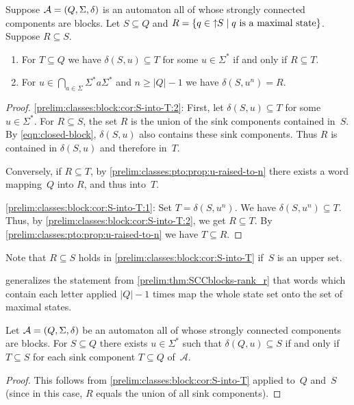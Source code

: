 \begin{corollary}  \label{prelim:classes:block:cor:S-into-T}
	\label{prelim:classes:block:cor:equalR}
	Suppose $\mathcal A = (Q, \Sigma, \delta)$ is an automaton all of whose strongly connected components are blocks.
	Let $S \subseteq Q$ and $R = \{ q \in \mbox{\ensuremath{\displaystyle \uparrow \!\!S}} \mid \text{$q$ is a maximal state} \}$.
	Suppose $R \subseteq S$.
	
	\begin{enumerate}
	\item \label{prelim:classes:block:cor:S-into-T:2} For $T \subseteq Q$ we have $\delta(S, u) \subseteq T$ for some $u \in \Sigma^*$ if and only if $R \subseteq T$.
		
	\item \label{prelim:classes:block:cor:S-into-T:1} For $u \in \bigcap_{a \in \Sigma} \Sigma^* a \Sigma^*$
	and $n \ge |Q| - 1$	we have
	$
	\delta(S, u^{n}) = R.
	$
	\end{enumerate}	
\end{corollary}
\begin{proof}
 \ref{prelim:classes:block:cor:S-into-T:2}: First, let $\delta(S, u) \subseteq T$
 for some $u \in \Sigma^*$.
 For $R \subseteq S$, the set $R$ is the union of the sink components contained in~$S$.
 By \cref{eqn:closed-block}, $\delta(S, u)$
 also contains these sink components.
 Thus $R$ is contained in $\delta(S, u)$ and therefore in~$T$.
 
 Conversely, if $R \subseteq T$, 
 by \cref{prelim:classes:pto:prop:u-raised-to-n} 
 there exists a word mapping~$Q$ into $R$,
 and thus into~$T$.
 
 \ref{prelim:classes:block:cor:S-into-T:1}: Set $T = \delta(S, u^n)$.
 We have $\delta(S, u^n) \subseteq T$.
 Thus, by \cref{prelim:classes:block:cor:S-into-T:2}, we get $R \subseteq T$.
 By \cref{prelim:classes:pto:prop:u-raised-to-n} we have $T \subseteq R$.
\end{proof}

Note that $R \subseteq S$ holds in \cref{prelim:classes:block:cor:S-into-T} if~$S$ is an upper set.

generalizes the 
statement from \cref{prelim:thm:SCCblocks-rank_r} that words which contain each letter applied $|Q| - 1$ times map the whole state set onto the set of maximal states.

\begin{corollary} \label{prelim:classes:block:cor:Q-into-S}
	Let $\mathcal A = (Q, \Sigma, \delta)$ be an automaton all of whose strongly connected components are blocks.
	For $S \subseteq Q$ there exists $u \in \Sigma^*$ 
	such that $\delta(Q, u) \subseteq S$
	if and only if $T \subseteq S$
	for each sink component $T \subseteq Q$ of~$\mathcal A$.	
\end{corollary}
\begin{proof}
	This follows from \cref{prelim:classes:block:cor:S-into-T}
	applied to~$Q$ and~$S$ (since in this case, $R$ equals the union of all sink components).
\end{proof}

